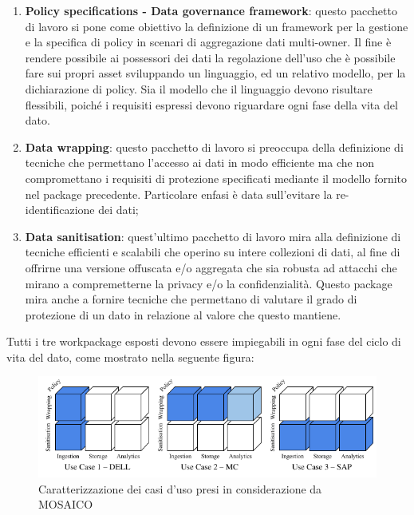 \documentclass[12pt,a4paper,twoside]{book}
\begin{document}
\begin{enumerate}
\label{tesiWP}
\item \textbf{Policy specifications - Data governance framework}: questo pacchetto di lavoro si pone come obiettivo la definizione di un framework per la gestione e la specifica di policy in scenari di aggregazione dati multi-owner. Il fine è rendere possibile ai possessori dei dati la regolazione dell'uso che è possibile fare sui propri asset sviluppando un linguaggio, ed un relativo modello, per la dichiarazione di policy. Sia il modello che il linguaggio devono risultare flessibili, poiché i requisiti espressi devono riguardare ogni fase della vita del dato.
\item \textbf{Data wrapping}: questo pacchetto di lavoro si preoccupa della definizione di tecniche che permettano l'accesso ai dati in modo efficiente ma che non compromettano i requisiti di protezione specificati mediante il modello fornito nel package precedente. Particolare enfasi è data sull'evitare la re-identificazione dei dati;
\item \textbf{Data sanitisation}: quest'ultimo pacchetto di lavoro mira alla definizione di tecniche efficienti e scalabili che operino su intere collezioni di dati, al fine di offrirne una versione offuscata e/o aggregata che sia robusta ad attacchi che mirano a compremetterne la privacy e/o la confidenzialità. Questo package mira anche a fornire tecniche che permettano di valutare il grado di protezione di un dato in relazione al valore che questo mantiene. 
\end{enumerate}
Tutti i tre workpackage esposti devono essere impiegabili in ogni fase del ciclo di vita del dato, come mostrato nella seguente figura:
\begin{figure}[H]
\centering
\includegraphics[scale=.65]{../immagini/MOSAICOUSES.png}
\caption{Caratterizzazione dei casi d'uso presi in considerazione da MOSAICO\cite{ProgettoMosaico}}
\label{MosUses}
\end{figure}
\end{document}
